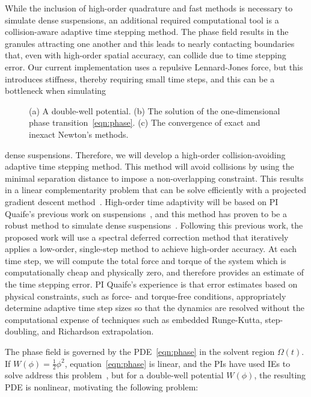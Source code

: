 While the inclusion of high-order quadrature and fast methods is
necessary to simulate dense suspensions, an additional required
computational tool is a collision-aware adaptive time stepping method.
The phase field results in the granules attracting one another and this
leads to nearly contacting boundaries that, even with high-order spatial
accuracy, can collide due to time stepping error. Our current
implementation uses a repulsive Lennard-Jones force, but this introduces
stiffness, thereby requiring small time steps, and this can be a
bottleneck when simulating
\begin{figure}
  \vspace{-0pt}
  \centering
   
  \vspace{-10pt}
  \caption{\label{fig:CA} \footnotesize (a) A double-well potential. (b)
  The solution of the one-dimensional phase
  transition~\eqref{eqn:phase}. (c) The convergence of exact and inexact
  Newton's methods.}
\end{figure}
dense suspensions. Therefore, we will develop a high-order
collision-avoiding adaptive time stepping method. This method will avoid
collisions by using the minimal separation distance to impose a
non-overlapping constraint. This results in a linear complementarity
problem that can be solve efficiently with a projected gradient descent
method~\cite{Yan2019}. High-order time adaptivity will be based on PI
Quaife's previous work on suspensions~\cite{qua-bir2016}, and this
method has proven to be a robust method to simulate dense
suspensions~\cite{qua-vee-you2019, kab-qua-bir2017, qua-gan-you2021}.
Following this previous work, the proposed work will use a spectral
deferred correction method that iteratively applies a low-order,
single-step method to achieve high-order accuracy. At each time step, we
will compute the total force and torque of the system which is
computationally cheap and physically zero, and therefore provides an
estimate of the time stepping error. PI Quaife's experience is that
error estimates based on physical constraints, such as force- and
torque-free conditions, appropriately determine adaptive time step sizes
so that the dynamics are resolved without the computational expense of
techniques such as embedded Runge-Kutta, step-doubling, and Richardson
extrapolation.

The phase field is governed by the PDE~\eqref{eqn:phase} in the solvent
region $\Omega(t)$. If $W(\phi) = \tfrac{1}{2}\phi^2$,
equation~\eqref{eqn:phase} is linear, and the PIs have used IEs to solve
address this problem~\cite{Fu2018_SIAM, FuQuRyYo22, fu-ryh-qua-you2022},
but for a double-well potential $W(\phi)$, the resulting PDE is
nonlinear, motivating the following problem:


